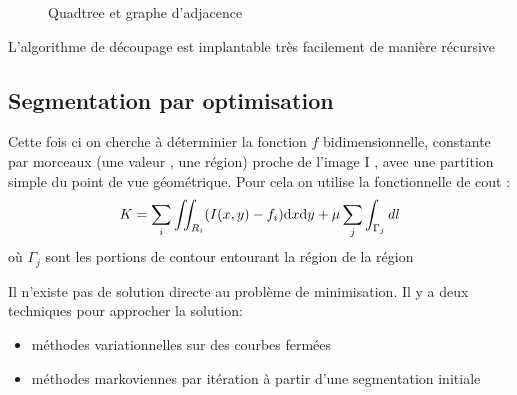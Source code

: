 \documentclass[main.tex]{subfiles}
\begin{document}
\begin{figure}[H]
  \centering
  \caption{Quadtree et graphe d'adjacence}
\end{figure}
\begin{rem}
  L'algorithme de découpage est implantable très facilement de manière récursive
\end{rem}


\subsection{Segmentation par optimisation}
\begin{prop}
Cette fois ci on cherche à déterminier la fonction $f$ bidimensionnelle, constante par morceaux (une valeur , une région) proche
de l’image I , avec une partition simple du point de vue géométrique. Pour cela on utilise la fonctionnelle de cout :
\[
  K = \sum_{i}^{} \iint_{R_i}(I(x,y)-f_i)\mbox{d} x \mbox{d} y + \mu \sum_{j}^{}\int_{\Gamma_j}^{}dl
\]
où $\Gamma_j$ sont les portions de contour entourant la région de la région
\end{prop}

\begin{rem}
  Il n'existe pas de solution directe au problème de minimisation. Il y a deux techniques pour approcher la solution:
  \begin{itemize}
  \item méthodes variationnelles sur des courbes fermées
  \item méthodes markoviennes par itération à partir d’une segmentation initiale
  \end{itemize}
\end{rem}
\end{document}
